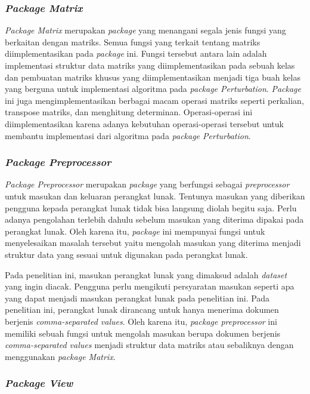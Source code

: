 \subsubsection{\textit{Package Matrix}}
\label{subsubsec:package-matrix}

\textit{Package Matrix} merupakan \textit{package} yang menangani segala jenis fungsi yang berkaitan dengan matriks. Semua fungsi yang terkait tentang matriks diimplementasikan pada \textit{package} ini. Fungsi tersebut antara lain adalah implementasi struktur data matriks yang diimplementasikan pada sebuah kelas dan pembuatan matriks khusus yang diimplementasikan menjadi tiga buah kelas yang berguna untuk implementasi algoritma pada \textit{package Perturbation}. \textit{Package} ini juga mengimplementasikan berbagai macam operasi matriks seperti perkalian, transpose matriks, dan menghitung determinan. Operasi-operasi ini diimplementasikan karena adanya kebutuhan operasi-operasi tersebut untuk membantu implementasi dari algoritma pada \textit{package Perturbation}.

\subsubsection{\textit{Package Preprocessor}}
\label{subsubsec:package-preprocessor}

\textit{Package Preprocessor} merupakan \textit{package} yang berfungsi sebagai \textit{preprocessor} untuk masukan dan keluaran perangkat lunak. Tentunya masukan yang diberikan pengguna kepada perangkat lunak tidak bisa langsung diolah begitu saja. Perlu adanya pengolahan terlebih dahulu sebelum masukan yang diterima dipakai pada perangkat lunak. Oleh karena itu, \textit{package} ini mempunyai fungsi untuk menyelesaikan masalah tersebut yaitu mengolah masukan yang diterima menjadi struktur data yang sesuai untuk digunakan pada perangkat lunak.

Pada penelitian ini, masukan perangkat lunak yang dimaksud adalah \textit{dataset} yang ingin diacak. Pengguna perlu mengikuti persyaratan masukan seperti apa yang dapat menjadi masukan perangkat lunak pada penelitian ini. Pada penelitian ini, perangkat lunak dirancang untuk hanya menerima dokumen berjenis \textit{comma-separated values}. Oleh karena itu, \textit{package preprocessor} ini memiliki sebuah fungsi untuk mengolah masukan berupa dokumen berjenis \textit{comma-separated values} menjadi struktur data matriks atau sebaliknya dengan menggunakan \textit{package Matrix}.

\subsubsection{\textit{Package View}}
\label{subsubsec:package-view}

